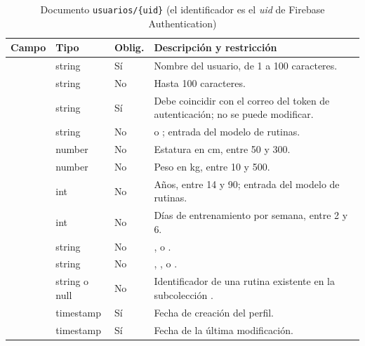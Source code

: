 \begin{table}[H]
\centering
\small
\begin{tabularx}{\textwidth}{|L{3.0cm}|L{1.8cm}|C{1.1cm}|Y|}
\hline
{} \textbf{Campo} & \textbf{Tipo} & \textbf{Oblig.} & \textbf{Descripción y restricción} \\
\hline
{} & string & Sí & Nombre del usuario, de 1 a 100 caracteres. \\ \hline
{} & string & No & Hasta 100 caracteres. \\ \hline
{} & string & Sí & Debe coincidir con el correo del token de autenticación; no se puede modificar. \\ \hline
{} & string & No &  o ; entrada del modelo de rutinas. \\ \hline
{} & number & No & Estatura en cm, entre 50 y 300. \\ \hline
{} & number & No & Peso en kg, entre 10 y 500. \\ \hline
{} & int & No & Años, entre 14 y 90; entrada del modelo de rutinas. \\ \hline
{} & int & No & Días de entrenamiento por semana, entre 2 y 6. \\ \hline
{} & string & No & ,  o . \\ \hline
{} & string & No & , ,  o . \\ \hline
{} & string o null & No & Identificador de una rutina existente en la subcolección . \\ \hline
{} & timestamp & Sí & Fecha de creación del perfil. \\ \hline
{} & timestamp & Sí & Fecha de la última modificación. \\
\hline
\end{tabularx}
\caption{Documento \texttt{usuarios/\{uid\}} (el identificador es el \emph{uid} de Firebase Authentication)}
\label{tab:dd-usuarios}
\end{table}

